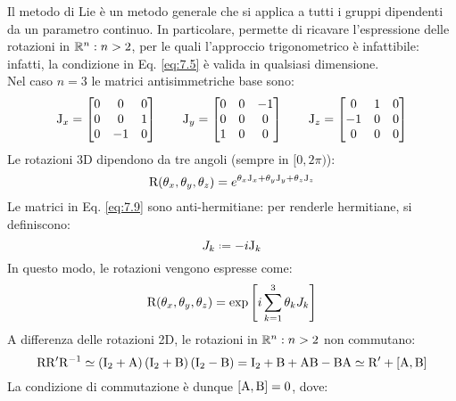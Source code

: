 Il metodo di Lie è un metodo generale che si applica a tutti i gruppi dipendenti da un parametro continuo. In particolare, permette di ricavare l'espressione delle rotazioni in $ \mathbb{R}^n : n > 2 $, per le quali l'approccio trigonometrico è infattibile: infatti, la condizione in Eq. \ref{eq:7.5} è valida in qualsiasi dimensione.\\
Nel caso $ n = 3 $ le matrici antisimmetriche base sono:
\begin{equation}
	\mathrm{J}_x =
	\begin{bmatrix}
		0 & 0 & 0 \\
		0 & 0 & 1 \\
		0 & -1 & 0
	\end{bmatrix}
	\qquad \mathrm{J}_y =
	\begin{bmatrix}
		0 & 0 & -1 \\
		0 & 0 & 0 \\
		1 & 0 & 0
	\end{bmatrix}
	\qquad \mathrm{J}_z =
	\begin{bmatrix}
		0 & 1 & 0 \\
		-1 & 0 & 0 \\
		0 & 0 & 0
	\end{bmatrix}
	\label{eq:7.9}
\end{equation}
Le rotazioni 3D dipendono da tre angoli (sempre in $ [0,2\pi) $):
\begin{equation}
	\mathrm{R}(\theta_x,\theta_y,\theta_z) = e^{\theta_x \mathrm{J}_x + \theta_y \mathrm{J}_y + \theta_z \mathrm{J}_z}
	\label{eq:7.10}
\end{equation}
Le matrici in Eq. \ref{eq:7.9} sono anti-hermitiane: per renderle hermitiane, si definiscono:
\begin{equation}
	J_k \defeq -i \tens{J}_k
	\label{eq:7.11}
\end{equation}
In questo modo, le rotazioni vengono espresse come:
\begin{equation}
	\mathrm{R}(\theta_x,\theta_y,\theta_z) = \exp \left[ i \sum_{k = 1}^{3} \theta_k J_k \right]
	\label{eq:7.12}
\end{equation}
A differenza delle rotazioni 2D, le rotazioni in $ \mathbb{R}^n : n > 2 $ non commutano:
\begin{equation}
	\mathrm{R}\mathrm{R}'\mathrm{R}^{-1} \simeq \left( \mathrm{I}_2 + \mathrm{A} \right) \left( \mathrm{I}_2 + \mathrm{B} \right) \left( \mathrm{I}_2 - \mathrm{B} \right) = \mathrm{I}_2 + \mathrm{B} + \mathrm{A}\mathrm{B} - \mathrm{B}\mathrm{A} \simeq \mathrm{R}' + \left[ \mathrm{A},\mathrm{B} \right]
\end{equation}
La condizione di commutazione è dunque $ [\mathrm{A},\mathrm{B}] = 0 $, dove:
